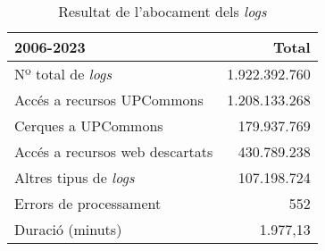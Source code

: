 \begin{table}
    \caption{Resultat de l'abocament dels \textit{logs}}
    \begin{tabular}{lr}
        \toprule
        \textbf{2006-2023} & Total\\
        \midrule
        Nº total de \textit{logs}       & 1.922.392.760\\
        Accés a recursos UPCommons      & 1.208.133.268\\
        Cerques a UPCommons             & 179.937.769\\
        Accés a recursos web descartats & 430.789.238\\
        Altres tipus de \textit{logs}   & 107.198.724\\
        Errors de processament          & 552\\
        Duració (minuts)                & 1.977,13\\
        \bottomrule
    \end{tabular}\label{tab:table}
\end{table}